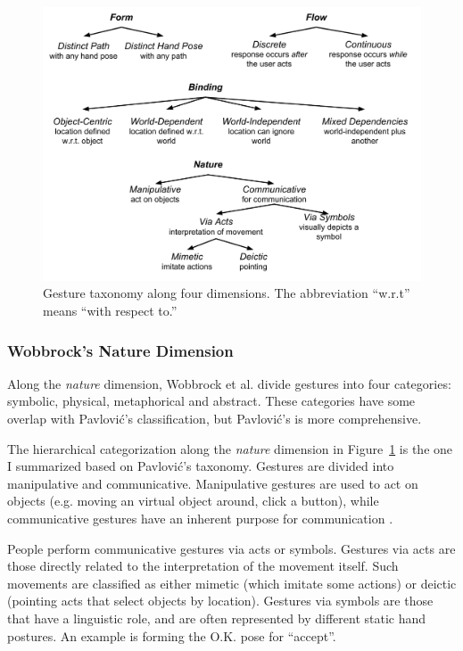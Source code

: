 \begin{figure}[tbh]
  \centering
  \includegraphics[width=\textwidth]{figures/taxonomy.pdf} \caption{Gesture taxonomy along
  four dimensions. The abbreviation ``w.r.t'' means ``with respect to.''}
  \label{fig:taxonomy}
\end{figure}

\subsubsection{Wobbrock's Nature Dimension}
Along the \textit{nature} dimension, Wobbrock et al. divide gestures into four
categories: symbolic, physical, metaphorical and abstract. These
categories have some overlap with Pavlovi\'{c}'s classification, but
Pavlovi\'{c}'s is more comprehensive. 

The hierarchical
categorization along the \textit{nature} dimension in Figure~\ref{fig:taxonomy}
is the one I summarized based on Pavlovi\'{c}'s taxonomy.
Gestures are divided into manipulative and communicative. Manipulative gestures are used to act on objects (e.g.
moving an virtual object around, click a button), while
communicative gestures have an inherent purpose for communication \cite{Pavlovic97}. 

People perform communicative gestures via acts or symbols. Gestures via acts are
those directly related to the interpretation of the movement itself. Such
movements are classified as either mimetic (which imitate some actions) or
deictic (pointing acts that select objects by location).
Gestures via symbols are those that have a linguistic role, and are often represented by different static hand postures. An example is forming the
O.K. pose for ``accept''. 

